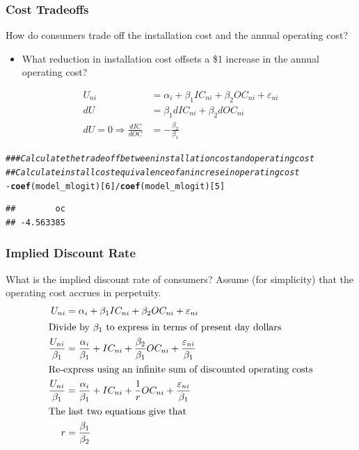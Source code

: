 \documentclass{beamer}\usepackage[]{graphicx}\usepackage[]{color}
\makeatletter
\newcommand{\hlnum}[1]{\textcolor[rgb]{0.686,0.059,0.569}{#1}}%
\newcommand{\hlcom}[1]{\textcolor[rgb]{0.678,0.584,0.686}{\textit{#1}}}%
\newcommand{\hlopt}[1]{\textcolor[rgb]{0,0,0}{#1}}%
\newcommand{\hlstd}[1]{\textcolor[rgb]{0.345,0.345,0.345}{#1}}%
\newcommand{\hlkwd}[1]{\textcolor[rgb]{0.737,0.353,0.396}{\textbf{#1}}}%
\newenvironment{kframe}{%
 \def\at@end@of@kframe{}%
 \ifinner\ifhmode%
  \def\at@end@of@kframe{\end{minipage}}%
  \begin{minipage}{\columnwidth}%
 \fi\fi%
 \def\FrameCommand##1{\hskip\@totalleftmargin \hskip-\fboxsep
 \colorbox{shadecolor}{##1}\hskip-\fboxsep
     \hskip-\linewidth \hskip-\@totalleftmargin \hskip\columnwidth}%
 \MakeFramed {\advance\hsize-\width
   \@totalleftmargin\z@ \linewidth\hsize
   \@setminipage}}%
 {\par\unskip\endMakeFramed%
 \at@end@of@kframe}
\newenvironment{knitrout}{}{} %
\makeatother
\begin{document}
\begin{frame}[fragile]\frametitle{Cost Tradeoffs}
    How do consumers trade off the installation cost and the annual operating cost?
    \begin{itemize}
        \item What reduction in installation cost offsets a \$1 increase in the annual operating cost?
    \end{itemize}
    \begin{align*}
        U_{ni} &= \alpha_i + \beta_1 IC_{ni} + \beta_2 OC_{ni} + \varepsilon_{ni} \\
        dU &= \beta_1 dIC_{ni} + \beta_2 dOC_{ni} \\
        dU = 0 \Rightarrow \frac{dIC}{dOC} &= -\frac{\beta_2}{\beta_1}
    \end{align*}
\begin{knitrout}\footnotesize
{}\color{fgcolor}\begin{kframe}
\begin{alltt}
\hlcom{### Calculate the tradeoff between installation cost and operating cost}
\hlcom{## Calculate install cost equivalence of an increse in operating cost}
\hlopt{-}\hlkwd{coef}\hlstd{(model_mlogit)[}\hlnum{6}\hlstd{]} \hlopt{/} \hlkwd{coef}\hlstd{(model_mlogit)[}\hlnum{5}\hlstd{]}
\end{alltt}
\begin{verbatim}
##        oc 
## -4.563385
\end{verbatim}
\end{kframe}
\end{knitrout}
\end{frame}

\begin{frame}\frametitle{Implied Discount Rate}
    What is the implied discount rate of consumers? Assume (for simplicity) that the operating cost accrues in perpetuity.
    \begin{align*}
        U_{ni} &= \alpha_i + \beta_1 IC_{ni} + \beta_2 OC_{ni} + \varepsilon_{ni} \\
        \intertext{Divide by $\beta_1$ to express in terms of present day dollars}
        \frac{U_{ni}}{\beta_1} &= \frac{\alpha_i}{\beta_1} + IC_{ni} + \frac{\beta_2}{\beta_1} OC_{ni} + \frac{\varepsilon_{ni}}{\beta_1} \\
        \intertext{Re-express using an infinite sum of discounted operating costs}
        \frac{U_{ni}}{\beta_1} &= \frac{\alpha_i}{\beta_1} + IC_{ni} + \frac{1}{r} OC_{ni} + \frac{\varepsilon_{ni}}{\beta_1} \\
        \intertext{The last two equations give that}
        r &= \frac{\beta_1}{\beta_2}
    \end{align*}
\end{frame}
\end{document}

